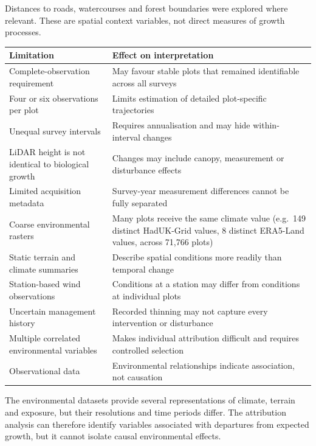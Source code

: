 \documentclass[11pt,a4paper]{report}
\begin{document}
Distances to roads, watercourses and forest boundaries were explored where relevant.
These are spatial context variables, not direct measures of growth processes.

\begin{table}[h]
\centering
\begin{tabular}{p{5.5cm}p{7.5cm}}
\hline
Limitation & Effect on interpretation \\
\hline
Complete-observation requirement & May favour stable plots that remained identifiable across all surveys \\
Four or six observations per plot & Limits estimation of detailed plot-specific trajectories \\
Unequal survey intervals & Requires annualisation and may hide within-interval changes \\
LiDAR height is not identical to biological growth & Changes may include canopy, measurement or disturbance effects \\
Limited acquisition metadata & Survey-year measurement differences cannot be fully separated \\
Coarse environmental rasters & Many plots receive the same climate value (e.g.\ 149 distinct HadUK-Grid values, 8 distinct ERA5-Land values, across 71,766 plots) \\
Static terrain and climate summaries & Describe spatial conditions more readily than temporal change \\
Station-based wind observations & Conditions at a station may differ from conditions at individual plots \\
Uncertain management history & Recorded thinning may not capture every intervention or disturbance \\
Multiple correlated environmental variables & Makes individual attribution difficult and requires controlled selection \\
Observational data & Environmental relationships indicate association, not causation \\
\hline
\end{tabular}
\end{table}

The environmental datasets provide several representations of climate, terrain and exposure, but their resolutions and time periods differ.
The attribution analysis can therefore identify variables associated with departures from expected growth, but it cannot isolate causal environmental effects.
\end{document}
